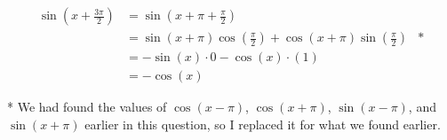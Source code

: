 \documentclass[12pt]{article} %
\newcommand*{\halfpi}{\frac{\pi}{2}}
\begin{document}
\begin{homeworkProblem}
    \begin{align*}
        \sin{(x + \frac{3\pi}{2})}
         & = \sin(x + \pi + \halfpi)                                       \\
         & = \sin(x + \pi) \cos(\halfpi) + \cos(x + \pi) \sin(\halfpi) & * \\
         & = - \sin(x) \cdot 0 - \cos(x) \cdot (1)                         \\
         & = - \cos(x)
    \end{align*}

    *
    We had found the values of $\cos(x - \pi)$,  $\cos(x + \pi)$, $\sin(x - \pi)$, and $\sin(x + \pi)$ earlier in this question,
    so I replaced it for what we found earlier.

\end{homeworkProblem}

\pagebreak
\end{document}

